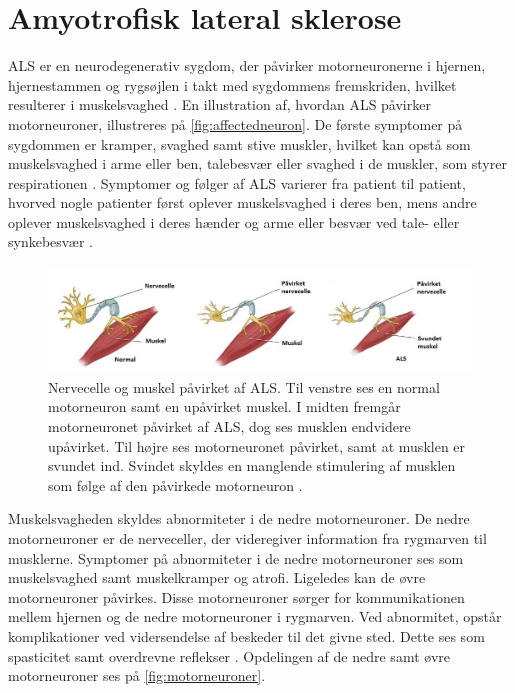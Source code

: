 \section{Amyotrofisk lateral sklerose} \label{sec:ALS}
ALS er en neurodegenerativ sygdom, der påvirker motorneuronerne i hjernen, hjernestammen og rygsøjlen i takt med sygdommens fremskriden, hvilket resulterer i muskelsvaghed \citep{henschke2012}. 
En illustration af, hvordan ALS påvirker motorneuroner, illustreres på \autoref{fig:affectedneuron}. 
De første symptomer på sygdommen er kramper, svaghed samt stive muskler, hvilket kan opstå som muskelsvaghed i arme eller ben, talebesvær eller svaghed i de muskler, som styrer respirationen \citep{nationalinstitute2016}. 
Symptomer og følger af ALS varierer fra patient til patient, hvorved nogle patienter først oplever muskelsvaghed i deres ben, mens andre oplever muskelsvaghed i deres hænder og arme eller besvær ved tale- eller synkebesvær \citep{nationalinstitute2016, miller2005}.

\begin{figure}[H]
\centering
\includegraphics[width=1\textwidth]{figures/affectedneuron}
\caption{Nervecelle og muskel påvirket af ALS. Til venstre ses en normal motorneuron samt en upåvirket muskel. I midten fremgår motorneuronet påvirket af ALS, dog ses musklen endvidere upåvirket. Til højre ses motorneuronet påvirket, samt at musklen er svundet ind. Svindet skyldes en manglende stimulering af musklen som følge af den påvirkede motorneuron \citep{drake2015}.}
\label{fig:affectedneuron}
\end{figure}
 
\noindent
Muskelsvagheden skyldes abnormiteter i de nedre motorneuroner. De nedre motorneuroner er de nerveceller, der videregiver information fra rygmarven til musklerne. 
Symptomer på abnormiteter i de nedre motorneuroner ses som muskelsvaghed samt muskelkramper og atrofi.
Ligeledes kan de øvre motorneuroner påvirkes. Disse motorneuroner sørger for kommunikationen mellem hjernen og de nedre motorneuroner i rygmarven. 
Ved abnormitet, opstår komplikationer ved vidersendelse af beskeder til det givne sted. 
Dette ses som spasticitet samt overdrevne reflekser \citep{nationalinstitute2016}. Opdelingen af de nedre samt øvre motorneuroner ses på \autoref{fig:motorneuroner}.

